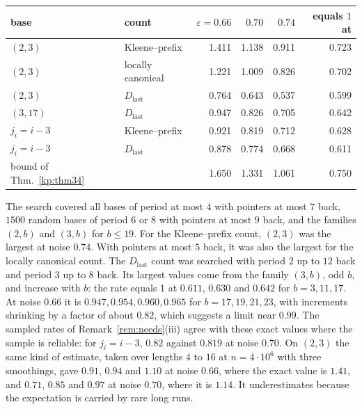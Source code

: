 \documentclass[11pt]{amsart}
\theoremstyle{definition}
\theoremstyle{remark}
\newcommand{\eps}{\varepsilon}
\begin{document}
\begin{center}
\begin{tabular}{llrrrr}
\toprule
base & count & $\eps=0.66$ & $0.70$ & $0.74$ & equals $1$ at\\
\midrule
$(2,3)$ & Kleene--prefix & 1.411 & 1.138 & 0.911 & 0.723\\
$(2,3)$ & locally canonical & 1.221 & 1.009 & 0.826 & 0.702\\
$(2,3)$ & $D_{\mathrm{last}}$ & 0.764 & 0.643 & 0.537 & 0.599\\
$(3,17)$ & $D_{\mathrm{last}}$ & 0.947 & 0.826 & 0.705 & 0.642\\
$j_i=i-3$ & Kleene--prefix & 0.921 & 0.819 & 0.712 & 0.628\\
$j_i=i-3$ & $D_{\mathrm{last}}$ & 0.878 & 0.774 & 0.668 & 0.611\\
bound of Thm.~\ref{kp:thm34} & & 1.650 & 1.331 & 1.061 & 0.750\\
\bottomrule
\end{tabular}
\end{center}

\noindent The search covered all bases of period at most $4$ with pointers at most $7$ back,
$1500$ random bases of period $6$ or $8$ with pointers at most $9$ back, and the families
$(2,b)$ and $(3,b)$ for $b\le19$. For the Kleene--prefix count, $(2,3)$ was the largest at noise
$0.74$. With pointers at most $5$ back, it was also the largest for the locally canonical count. The
$D_{\mathrm{last}}$ count was searched with period $2$ up to $12$ back and period $3$ up to $8$
back. Its largest values come from the family $(3,b)$, odd $b$, and increase with $b$: the rate
equals $1$ at $0.611$, $0.630$ and $0.642$ for $b=3,11,17$. At noise $0.66$ it is
$0.947,0.954,0.960,0.965$ for $b=17,19,21,23$, with increments shrinking by a factor of about
$0.82$, which suggests a limit near $0.99$. The sampled rates of
Remark~\ref{rem:needs}(iii) agree with these exact values where the sample is reliable: for
$j_i=i-3$, $0.82$ against $0.819$ at noise $0.70$. On $(2,3)$ the same kind of estimate, taken
over lengths $4$ to $16$ at $n=4\cdot10^6$ with three smoothings, gave $0.91$, $0.94$ and $1.10$ at
noise $0.66$, where the exact value is $1.41$, and $0.71$, $0.85$ and $0.97$ at noise $0.70$, where it
is $1.14$. It underestimates because the expectation is carried by rare long runs.
\end{document}
